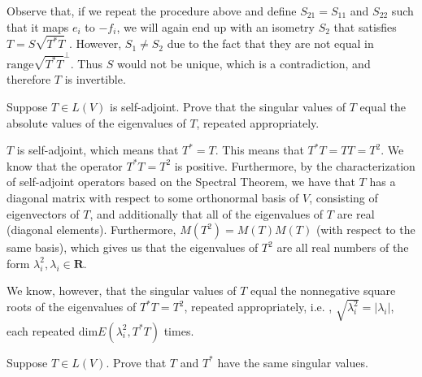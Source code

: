 \begin{solution}
    Observe that, if we repeat the procedure above and define $S_{21} = S_{11}$ and $S_{22}$ such that it maps $e_i$ to $-f_i$, we will again end up with an isometry $S_2$ that satisfies $T = S\sqrt{T^*T}$ . However, $S_1 \neq S_2$ due to the fact that they are not equal in $\text{range} \sqrt{T^*T}^\bot$. Thus $S$ would not be unique, which is a contradiction, and therefore $T$ is invertible.
\end{solution}

\begin{exercise}{10}
    Suppose $T \in L(V)$ is self-adjoint. Prove that the singular values of $T$ equal the absolute values of the eigenvalues of $T$, repeated appropriately.
\end{exercise}

\begin{solution}
    
    $T$ is self-adjoint, which means that $T^* = T$. This means that $T^*T = TT = T^2$. We know that the operator $T^*T = T^2$ is positive. Furthermore, by the characterization of self-adjoint operators based on the Spectral Theorem, we have that $T$ has a diagonal matrix with respect to some orthonormal basis of $V$, consisting of eigenvectors of $T$, and additionally that all of the eigenvalues of $T$ are real (diagonal elements). Furthermore, $M(T^2) = M(T)M(T)$ (with respect to the same basis), which gives us that the eigenvalues of $T^2$ are all real numbers of the form $\lambda_i^2, \lambda_i \in \mathbf{R}$.

    We know, however, that the singular values of $T$ equal the nonnegative square roots of the eigenvalues of $T^*T = T^2$, repeated appropriately, i.e. , $\sqrt{\lambda_i^2} = \lvert \lambda_i \rvert $, each repeated $\text{dim} E(\lambda_i^2, T^*T)$ times.
\end{solution}

\begin{exercise}{11}
    Suppose $T \in L(V)$. Prove that $T$ and $T^*$ have the same singular values.
\end{exercise}

